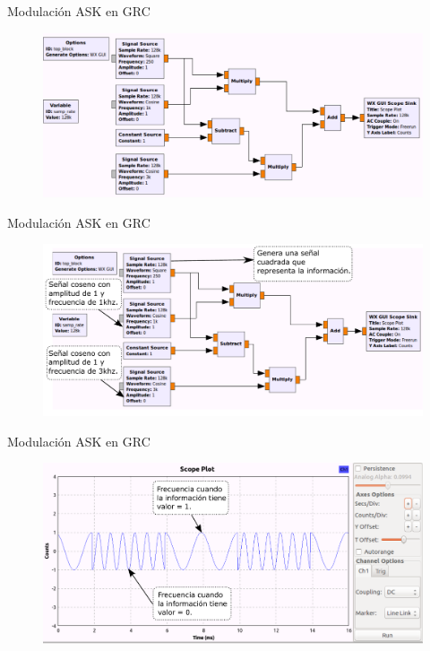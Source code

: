 \begin{frame}{Modulación ASK en GRC}
\vspace{-8mm}
\begin{figure}[H]
\centering
\includegraphics[width=\textwidth]{parte1/lab4/pdf/lab4_4.pdf}
\end{figure}
\end{frame}

\begin{frame}{Modulación ASK en GRC}
\begin{figure}[H]
\centering
\includegraphics[width=\textwidth]{parte1/lab4/pdf/lab4_5.pdf}
\end{figure}
\end{frame}

\begin{frame}{Modulación ASK en GRC}
\begin{figure}[H]
\centering
\includegraphics[width=\textwidth]{parte1/lab4/pdf/lab4_6.pdf}
\end{figure}
\end{frame}

